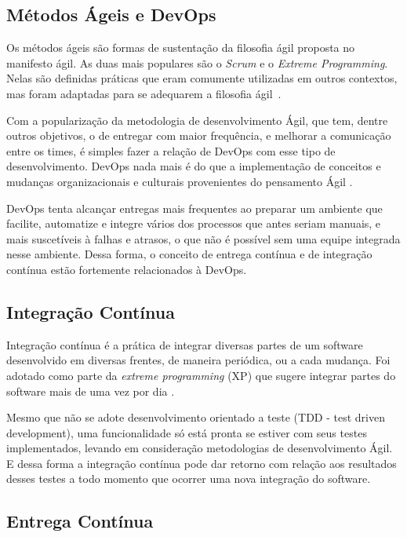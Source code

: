 \subsection{Métodos Ágeis e DevOps}

Os métodos ágeis são formas de sustentação da filosofia ágil proposta no manifesto
ágil. As duas mais populares são o \textit{Scrum} e o \textit{Extreme Programming}. Nelas
são definidas práticas que eram comumente utilizadas em outros contextos,
mas foram adaptadas para se adequarem a filosofia ágil~\cite{shore:2007}.

Com a popularização da metodologia de desenvolvimento Ágil, que tem, dentre outros
objetivos, o de entregar com maior frequência, e melhorar a comunicação entre os
times, é simples fazer a relação de DevOps com esse tipo de desenvolvimento.
DevOps nada mais é do que a implementação de conceitos e mudanças organizacionais
e culturais provenientes do pensamento Ágil \cite{scott2014}.

DevOps tenta alcançar entregas mais frequentes ao preparar um ambiente que facilite,
automatize e integre vários dos processos que antes seriam manuais, e mais
suscetíveis à falhas e atrasos, o que não é possível sem uma equipe integrada
nesse ambiente. Dessa forma, o conceito de entrega contínua e de integração
contínua estão fortemente relacionados à DevOps.~\cite{adambertram:2016}

\subsection{Integração Contínua}

Integração contínua é a prática de integrar diversas partes de um software
desenvolvido em diversas frentes, de maneira periódica, ou a cada mudança.
Foi adotado como parte da \textit{extreme programming} (XP) que sugere integrar
partes do software mais de uma vez por dia \cite{fowler2006continuous}.

Mesmo que não se adote desenvolvimento orientado a teste (TDD - test driven 
development), uma funcionalidade só está pronta se estiver com seus testes 
implementados, levando em consideração metodologias de desenvolvimento Ágil. 
E dessa forma a integração contínua pode dar retorno com relação aos resultados
desses testes a todo momento que ocorrer uma nova integração do software.

\subsection{Entrega Contínua}

